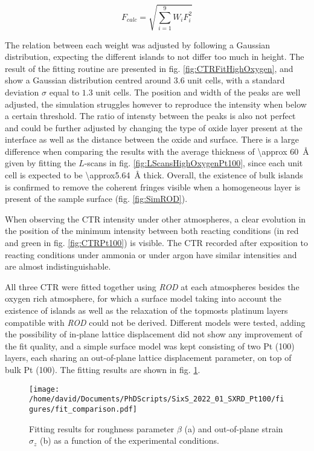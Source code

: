 \begin{equation}
    F_{calc} = \sqrt{\sum_{i=1}^{9} W_i F_i^2}
    \label{eq:Fcalc}
\end{equation}

The relation between each weight was adjusted by following a Gaussian distribution, expecting the different islands to not differ too much in height.
The result of the fitting routine are presented in fig. \ref{fig:CTRFitHighOxygen}, and show a Gaussian distribution centred around $3.6$ unit cells, with a standard deviation $\sigma$ equal to $1.3$ unit cells.
The position and width of the  peaks are well adjusted, the simulation struggles however to reproduce the intensity when below a certain threshold.
The ratio of intensty between the  peaks is also not perfect and could be further adjusted by changing the type of oxide layer present at the interface as well as the distance between the oxide and surface.
There is a large difference when comparing the results with the average thickness of \qty{\approx 60}{\angstrom} given by fitting the $L$-scans in fig. \ref{fig:LScansHighOxygenPt100}, since each unit cell is expected to be \qty{\approx5.64}{\angstrom} thick.
Overall, the existence of bulk  islands is confirmed to remove the coherent fringes visible when a homogeneous layer is present of the sample surface (fig. \ref{fig:SimROD}).

When observing the CTR intensity under other atmospheres, a clear evolution in the position of the minimum intensity between both reacting conditions (in red and green in fig. \ref{fig:CTRPt100}) is visible.
The CTR recorded after exposition to reacting conditions under ammonia or under argon have similar intensities and are almost indistinguishable.

All three CTR were fitted together using \textit{ROD} at each atmospheres besides the oxygen rich atmosphere, for which a surface model taking into account the existence of  islands as well as the relaxation of the topmosts platinum layers compatible with \textit{ROD} could not be derived.
Different models were tested, adding the possibility of in-plane lattice displacement did not show any improvement of the fit quality, and a simple surface model was kept consisting of two Pt (100) layers, each sharing an out-of-plane lattice displacement parameter, on top of bulk Pt (100).
The fitting results are shown in fig. \ref{fig:CTRFit100}.

\begin{figure}[!htb]
    \centering
    \texttt{[image: /home/david/Documents/PhDScripts/SixS\_2022\_01\_SXRD\_Pt100/figures/fit\_comparison.pdf]}
    \caption{
        Fitting results for roughness parameter $\beta$ (a) and out-of-plane strain $\sigma_z$ (b) as a function of the experimental conditions.
    }
    \label{fig:CTRFit100}
\end{figure}

